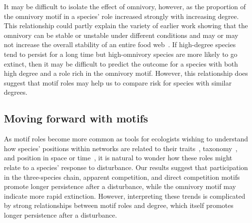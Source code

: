 \documentclass[12pt]{article}
\begin{document}
\begin{spacing}{2.0}
        It may be difficult to isolate the effect of omnivory, however, as the proportion of the omnivory motif in a species' role increased strongly with increasing degree. 
        This relationship could partly explain the variety of earlier work showing that the omnivory can be stable or unstable under different conditions and may or may not increase the overall stability of an entire food web~\citep{McCann1997,Emmerson2004,Borrelli2015a,Monteiro2016}.
        If high-degree species tend to persist for a long time but high-omnivory species are more likely to go extinct, then it may be difficult to predict the outcome for a species with both high degree and a role rich in the omnivory motif.
        However, this relationship does suggest that motif roles may help us to compare risk for species with similar degrees.


	\subsection*{Moving forward with motifs}	

        As motif roles become more common as tools for ecologists wishing to understand how species' positions within networks are related to their traits~\citep{Cirtwill2018EcolLett}, taxonomy~\citep{Stouffer2007}, and position in space or time~\citep{Baker2015}, it is natural to wonder how these roles might relate to a species' response to disturbance. 
        Our results suggest that participation in the three-species chain, apparent competition, and direct competition motifs promote longer persistence after a disturbance, while the omnivory motif may indicate more rapid extinction.
        However, interpreting these trends is complicated by strong relationships between motif roles and degree, which itself promotes longer persistence after a disturbance.
        

\end{spacing}
\end{document}
